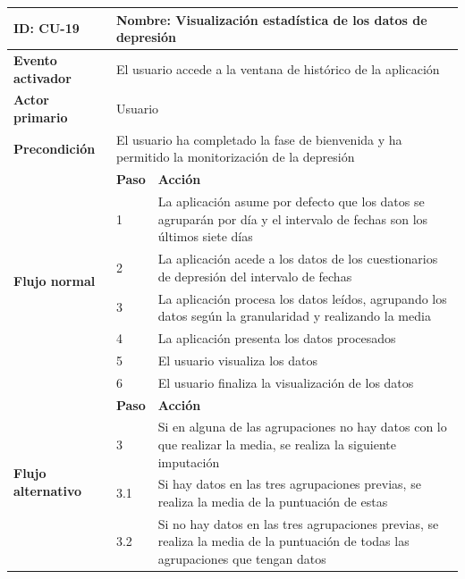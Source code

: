             \begin{table}[h]
                \centering
                \begin{tabularx}{\textwidth}{|l|l|X|}
                    \hline
                    \textbf{ID:} CU-19 & \multicolumn{2}{|X|}{\textbf{Nombre}: Visualización estadística de los datos de depresión} \\
                    \hline
                    \textbf{Evento activador} & \multicolumn{2}{|X|}{El usuario accede a la ventana de histórico de la aplicación} \\
                    \hline
                    \textbf{Actor primario} & \multicolumn{2}{|X|}{Usuario} \\
                    \hline
                    \textbf{Precondición} & \multicolumn{2}{|X|}{El usuario ha completado la fase de bienvenida y ha permitido la monitorización de la depresión} \\
                    \hline
                    \multirow{7}{*}{\textbf{Flujo normal}} & \textbf{Paso} & \textbf{Acción} \\
                    \cline{2-3} & 1 & La aplicación asume por defecto que los datos se agruparán por día y el intervalo de fechas son los últimos siete días \\
                    \cline{2-3} & 2 & La aplicación acede a los datos de los cuestionarios de depresión del intervalo de fechas \\
                    \cline{2-3} & 3 & La aplicación procesa los datos leídos, agrupando los datos según la granularidad y realizando la media \\
                    \cline{2-3} & 4 & La aplicación presenta los datos procesados \\
                    \cline{2-3} & 5 & El usuario visualiza los datos \\
                    \cline{2-3} & 6 & El usuario finaliza la visualización de los datos \\
                    \hline
                    \multirow{5}{*}{\textbf{Flujo alternativo}} & \textbf{Paso} & \textbf{Acción} \\
                    \cline{2-3} & 3 & Si en alguna de las agrupaciones no hay datos con lo que realizar la media, se realiza la siguiente imputación \\
                    \cline{2-3} & 3.1 & Si hay datos en las tres agrupaciones previas, se realiza la media de la puntuación de estas \\
                    \cline{2-3} & 3.2 & Si no hay datos en las tres agrupaciones previas, se realiza la media de la puntuación de todas las agrupaciones que tengan datos \\

\end{tabularx}
\end{table}
